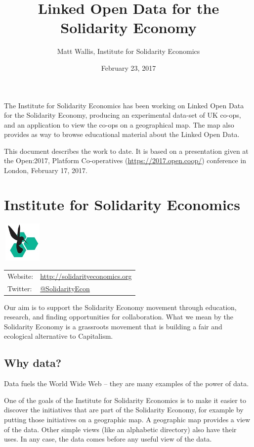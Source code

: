 \documentclass[11pt,twoside,a4paper]{article}
\title{Linked Open Data for the Solidarity Economy}
\author{Matt Wallis, Institute for Solidarity Economics}
\date{February 23, 2017}
\begin{document}
\maketitle

The Institute for Solidarity Economics has been working on Linked Open Data for the Solidarity Economy,
producing an experimental data-set of UK co-ops, and an application to view the co-ops on a geographical map.
The map also provides as way to browse educational material about the Linked Open Data.

This document describes the work to date.
It is based on a presentation given at the Open:2017,
Platform Co-operatives (\url{https://2017.open.coop/}) conference in London, February 17, 2017.

\section{Institute for Solidarity Economics}
  \begin{center}
    \includegraphics[height=2cm,width=2cm]{ise-logo.jpg}

    \begin{tabular}{l l}
      Website: & \url{http://solidarityeconomics.org} \\
      Twitter: & \href{https://twitter.com/SolidarityEcon}{@SolidarityEcon} \\
    \end{tabular}
  \end{center}

Our aim is to support the Solidarity Economy movement through education, research, and finding opportunities for collaboration.
What we mean by the Solidarity Economy is a grassroots movement that is building a fair and ecological alternative to Capitalism.


\subsection{Why data?}

Data fuels the World Wide Web -- they are many examples of the power of data. 

One of the goals of the Institute for Solidarity Economics is to make it easier to discover the initiatives that are part of the Solidarity Economy,
for example by putting those initiatives on a geographic map.
A geographic map provides a view of the data. Other simple views (like an alphabetic directory) also have their uses.
In any case, the data comes before any useful view of the data.
\end{document}
